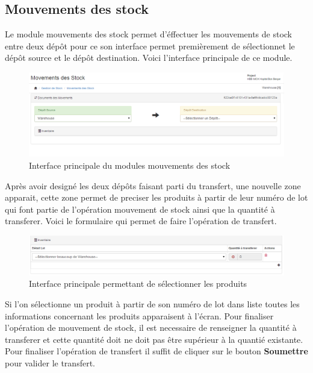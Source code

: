\documentclass[12pt,a4paper]{report}
\begin{document}
\newpage
\subsection{Mouvements des stock}
Le module mouvements des stock permet d'éffectuer les mouvements de stock entre deux dépôt pour ce son interface permet premièrement de sélectionnet le dépôt source et le dépôt destination. Voici l'interface principale de ce module.

\begin{figure}[h]
\begin{center}
\includegraphics[width=14cm]{pic/MouvStock.png}
\end{center}
\caption{Interface principale du modules mouvements des stock}
\label{Interface principale du modules mouvements des stock}
\end{figure}

Après avoir designé les deux dépôts faisant parti du transfert, une nouvelle zone apparait, cette zone permet de preciser les produits à partir de leur numéro de lot qui font partie de l'opération mouvement de stock ainsi que la quantité à transferer. 
Voici le formulaire qui permet de faire l'opération de transfert.

\begin{figure}[h]
\begin{center}
\includegraphics[width=14cm]{pic/SelectProduit.png}
\end{center}
\caption{Interface principale permettant de sélectionner les produits}
\label{Interface principale permettant de sélectionner les produits}
\end{figure}

\newpage

Si l'on sélectionne un produit à partir de son numéro de lot dans liste toutes les informations concernant les produits apparaisent à l'écran. Pour finaliser l'opération de mouvement de stock, il est necessaire de renseigner la quantité à transferer et cette quantité doit ne doit pas être supérieur à la quantié existante. Pour finaliser l'opération de transfert il suffit de cliquer sur le bouton \textbf{Soumettre} pour valider le transfert.
\end{document}
